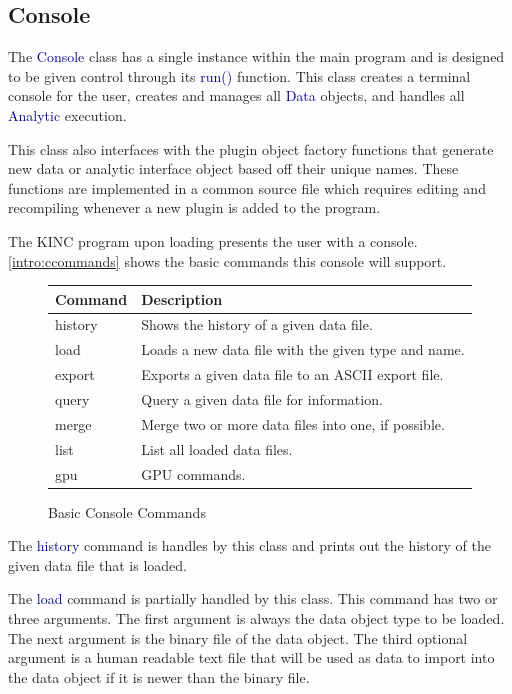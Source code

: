 \documentclass[10pt]{article}
\providecommand{\h}[1]{\textcolor{darkblue}{#1}}
\begin{document}
\subsection{Console}

The \h{Console} class has a single instance within the main program and is 
designed to be given control through its \h{run()} 
function. This class creates a terminal console for the user, creates and 
manages all \h{Data} objects, and handles all \h{Analytic} execution.

This class also interfaces with the plugin object factory functions that 
generate new data or analytic interface object based off their unique names. 
These functions are implemented in a common source file which requires editing 
and recompiling whenever a new plugin is added to the program.

The KINC program upon loading presents the user with a console. 
\autoref{intro:ccommands} shows the basic commands this console will support.

\begin{figure}[H]
\begin{mdframed}[style=vtable]
\begin{tabularx}{\textwidth}{|l|X|}
\hline
\textbf{Command} & \textbf{Description} \\
\hline
history & Shows the history of a given data file. \\
\hline
load & Loads a new data file with the given type and name. \\
\hline
export & Exports a given data file to an ASCII export file. \\
\hline
query & Query a given data file for information. \\
\hline
merge & Merge two or more data files into one, if possible. \\
\hline
list & List all loaded data files. \\
\hline
gpu & GPU commands. \\
\hline
\end{tabularx}
\end{mdframed}
\caption{Basic Console Commands}
\label{intro:ccommands}
\end{figure}

The \h{history} command is handles by this class and prints out the history of 
the given data file that is loaded.

The \h{load} command is partially handled by this class. This command has two 
or three arguments. The first argument is always the data object type to be 
loaded. The next argument is the binary file of the data object. The third 
optional argument is a human readable text file that will be used as data to 
import into the data object if it is newer than the binary file.
\end{document}
